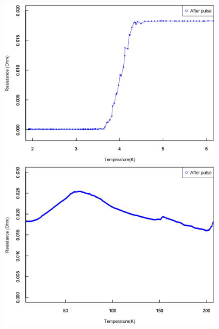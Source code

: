 \begin{figure}[htb]
 \begin{minipage}{\hsize}
    \begin{center}
   \includegraphics[width=0.9\hsize]{results_discussions/181228_after_pulse.eps}
  \end{center}
  \caption{}
  \label{fig:181228_after_pulse}
 \end{minipage}
 \begin{minipage}{\hsize}
     \begin{center}
   \includegraphics[width=0.9\hsize]{results_discussions/181228_after_pulse2.eps}
  \end{center}
  \caption{}
  \label{fig:181228_after_pulse2}
   \end{minipage}
\end{figure}


